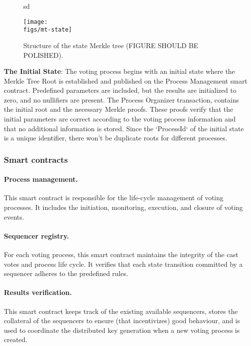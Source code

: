 \begin{figure}[h]
sd	\centerline{\texttt{[image: \\figs/mt-state]}}
	\caption{Structure of the state Merkle tree (FIGURE SHOULD BE POLISHED).}
	\label{fig:mt-state}
\end{figure}

\textbf{The Initial State}: The voting process begins with an initial state where the Merkle Tree Root is established and published on the Process Management smart contract. Predefined parameters are included, but the results are initialized to zero, and no nullifiers are present. The Process Organizer transaction, contains the initial root and the necessary Merkle proofs. These proofs verify that the initial parameters are correct according to the voting process information and that no additional information is stored. Since the `ProcessId` of the initial state is a unique identifier, there won't be duplicate roots for different processes.


\subsubsection{Smart contracts}

\paragraph{Process management.} This smart contract is responsible for the life-cycle management of voting processes. It includes the initiation, monitoring, execution, and closure of voting events.

\paragraph{Sequencer registry.} For each voting process, this smart contract maintains the integrity of the cast votes and process life cycle. It verifies that each state transition committed by a sequencer adheres to the predefined rules.

\paragraph{Results verification.} This smart contract keeps track of the existing available sequencers, stores the collateral of the sequencers to ensure (that incentivizes) good behaviour, and is used to coordinate the distributed key generation when a new voting process is created.\\

